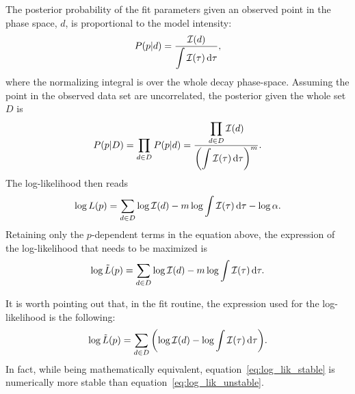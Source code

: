     The posterior probability of the fit parameters given an observed point in the phase space, $d$, is proportional to the model intensity:
    \begin{equation}
        P(p\vert d) = \frac{\mathcal{I}(d)}{\displaystyle\int \mathcal{I}(\tau)\mathop{}\!\textup{d}\tau},
    \end{equation}
    where the normalizing integral is over the whole decay phase-space.
    Assuming the point in the observed data set are uncorrelated, the posterior given the whole set $D$ is
    \begin{equation}
        P(p\vert D) = \prod_{d\in D} P(p\vert d) = \frac{\displaystyle\prod_{d\in D}\mathcal{I}(d)}{\displaystyle\left(\int \mathcal{I}(\tau)\mathop{}\!\textup{d}\tau\right)^m}.
    \end{equation}
    The log-likelihood then reads
    \begin{equation}
        \log L(p) = \sum_{d\in D}\log \mathcal{I}(d) - m\log\int \mathcal{I}(\tau) \mathop{}\!\textup{d} \tau - \log \alpha.
    \end{equation}
    Retaining only the $p$-dependent terms in the equation above, the expression of the log-likelihood that needs to be maximized is
    \begin{equation}\label{eq:log_lik_unstable}
        \log \tilde L(p) = \sum_{d\in D}\log \mathcal{I}(d) - m\log \int \mathcal{I}(\tau)\mathop{}\!\textup{d}\tau.
    \end{equation}


    It is worth pointing out that, in the fit routine, the expression used for the log-likelihood is the following:
    \begin{equation}\label{eq:log_lik_stable}
        \log \tilde L(p) = \sum_{d\in D}\left(\log \mathcal{I}(d) - \log \int \mathcal{I}(\tau)\mathop{}\!\textup{d}\tau\right)\!.
    \end{equation}
    In fact, while being mathematically equivalent, equation~\eqref{eq:log_lik_stable} is numerically more stable than equation~\eqref{eq:log_lik_unstable}.
